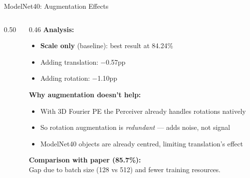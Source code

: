 \documentclass[aspectratio=169,11pt]{beamer}
\begin{document}
\begin{frame}[shrink=15]{ModelNet40: Augmentation Effects}
  \begin{columns}[T]
    \begin{column}{0.50\textwidth}
      \begin{center}
      \end{center}
    \end{column}
    \begin{column}{0.46\textwidth}
      \textbf{Analysis:}
      \begin{itemize}
        \item \textbf{Scale only} (baseline): best result at 84.24\%
        \item Adding translation: $-$0.57pp
        \item Adding rotation: $-$1.10pp
      \end{itemize}

      \vspace{0.5em}
      \textbf{Why augmentation doesn't help:}
      \begin{itemize}
        \item With 3D Fourier PE the Perceiver already handles rotations natively
        \item So rotation augmentation is \emph{redundant} --- adds noise, not signal
        \item ModelNet40 objects are already centred, limiting translation's effect
      \end{itemize}

      \vspace{0.3em}
      \textbf{Comparison with paper (85.7\%):}\\
      Gap due to batch size (128 vs 512) and fewer training resources.
    \end{column}
  \end{columns}
\end{frame}
\end{document}
